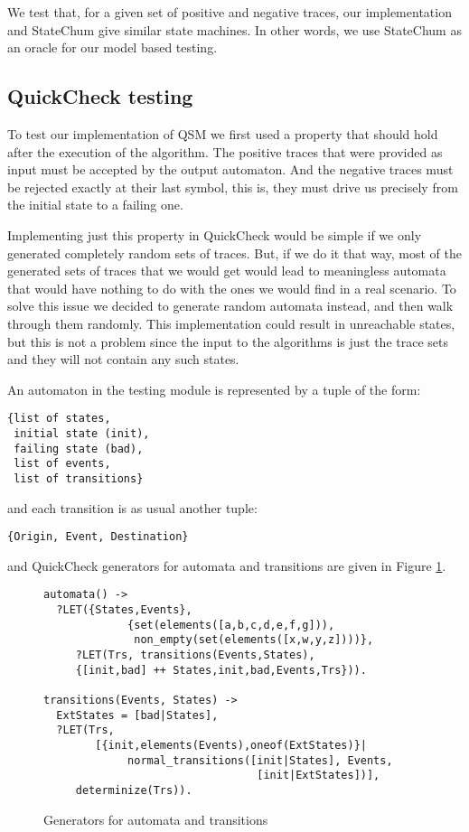 \documentclass[]{sigplanconf}
\begin{document}
We test that, for a given set of positive and negative traces,
our implementation and StateChum give similar state machines.
In other words, we use StateChum as an oracle for our model based testing.

\subsection{QuickCheck testing}

To test our implementation of QSM we first used a property
that should hold after the execution of the algorithm. The positive
traces that were provided as input must be accepted by the output
automaton. And the negative traces must be rejected exactly at their
last symbol, this is, they must drive us precisely from the initial
state to a failing one.

Implementing just this property in QuickCheck would be simple if we only
generated completely random sets of traces. But, if we do it that way,
most of the generated sets of traces that we would get would lead to
meaningless automata that would have nothing to do with the ones we
would find in a real scenario. To solve this issue we decided to
generate random automata instead, and then walk through them randomly.
This implementation could result in unreachable states, but this is not
a problem since the input to the algorithms is just the trace sets and they
will not contain any such states.

An automaton in the testing module is represented by a tuple of the form:
\begin{verbatim}
{list of states, 
 initial state (init), 
 failing state (bad), 
 list of events, 
 list of transitions}
\end{verbatim}
and each
transition is as usual another tuple:
\begin{verbatim}
{Origin, Event, Destination}
\end{verbatim}
and QuickCheck generators for automata and transitions are given in Figure \ref{generateAT}.

\begin{figure}
\begin{verbatim}
automata() ->
  ?LET({States,Events}, 
             {set(elements([a,b,c,d,e,f,g])),
              non_empty(set(elements([x,w,y,z])))},
     ?LET(Trs, transitions(Events,States),
     {[init,bad] ++ States,init,bad,Events,Trs})).

transitions(Events, States) ->
  ExtStates = [bad|States],
  ?LET(Trs, 
        [{init,elements(Events),oneof(ExtStates)}|
	         normal_transitions([init|States], Events, 
	                             [init|ExtStates])],
	 determinize(Trs)).
\end{verbatim}
\caption{Generators for automata and transitions}
\label{generateAT}
\end{figure}
\end{document}
